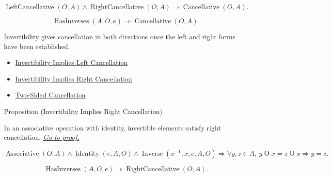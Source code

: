 \begin{remark*}
\[
\operatorname{LeftCancellative}(O,A)
\land
\operatorname{RightCancellative}(O,A)
\Longrightarrow
\operatorname{Cancellative}(O,A).
\]
\end{remark*}

\begin{remark*}
\[
\operatorname{HasInverses}(A,O,e)
\Longrightarrow
\operatorname{Cancellative}(O,A).
\]
\end{remark*}

\begin{remark*}[Interpretation]
Invertibility gives cancellation in both directions once the left and right
forms have been established.
\end{remark*}

\begin{dependencies}
\begin{itemize}
  \item \hyperref[prop:invertibility-implies-left-cancellation]{Invertibility Implies Left Cancellation}
  \item \hyperref[prop:invertibility-implies-right-cancellation]{Invertibility Implies Right Cancellation}
  \item \hyperref[def:two-sided-cancellation]{Two-Sided Cancellation}
\end{itemize}
\end{dependencies}

\begin{propositionbox}{Proposition (Invertibility Implies Right Cancellation)}
\begin{proposition}
\label{prop:invertibility-implies-right-cancellation}
In an associative operation with identity, invertible elements satisfy right
cancellation.
\hyperref[prf:invertibility-implies-right-cancellation]{\textit{Go to proof.}}
\end{proposition}
\end{propositionbox}

\begin{remark*}
\[
\operatorname{Associative}(O,A)
\land
\operatorname{Identity}(e,A,O)
\land
\operatorname{Inverse}(x^{-1},x,e,A,O)
\Longrightarrow
\forall y,z\in A,\ y\mathbin{O}x=z\mathbin{O}x \Rightarrow y=z.
\]
\end{remark*}

\begin{remark*}
\[
\operatorname{HasInverses}(A,O,e)
\Longrightarrow
\operatorname{RightCancellative}(O,A).
\]
\end{remark*}

